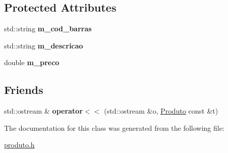 \subsection*{Protected Attributes}
\begin{DoxyCompactItemize}
\item 
std\+::string {\bfseries m\+\_\+cod\+\_\+barras}\hypertarget{classProduto_a2e772f6b851f2a2c7d7bc6853af7ca83}{}\label{classProduto_a2e772f6b851f2a2c7d7bc6853af7ca83}

\item 
std\+::string {\bfseries m\+\_\+descricao}\hypertarget{classProduto_aacf69c2cf01b6040138767a47c1e3f4b}{}\label{classProduto_aacf69c2cf01b6040138767a47c1e3f4b}

\item 
double {\bfseries m\+\_\+preco}\hypertarget{classProduto_af4f68aad97167802a1dca2b8ddb188eb}{}\label{classProduto_af4f68aad97167802a1dca2b8ddb188eb}

\end{DoxyCompactItemize}
\subsection*{Friends}
\begin{DoxyCompactItemize}
\item 
std\+::ostream \& {\bfseries operator$<$$<$} (std\+::ostream \&o, \hyperlink{classProduto}{Produto} const \&t)\hypertarget{classProduto_a75e56b3684b7859fc15d147b7d27f6b0}{}\label{classProduto_a75e56b3684b7859fc15d147b7d27f6b0}

\end{DoxyCompactItemize}


The documentation for this class was generated from the following file\+:\begin{DoxyCompactItemize}
\item 
\hyperlink{produto_8h}{produto.\+h}\end{DoxyCompactItemize}
